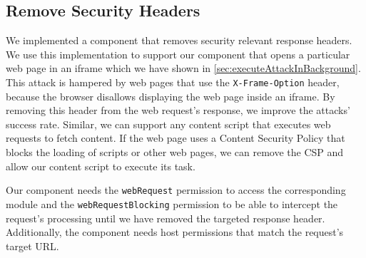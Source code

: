 \subsection{Remove Security Headers}
\label{sec:removeSecurityHeaders}
	
	We implemented a component that removes security relevant response headers. We use this implementation to support our component that opens a particular web page in an iframe which we have shown in \autoref{sec:executeAttackInBackground}. This attack is hampered by web pages that use the \texttt{X-Frame-Option} header, because the browser disallows displaying the web page inside an iframe. By removing this header from the web request's response, we improve the attacks' success rate. Similar, we can support any content script that executes web requests to fetch content. If the web page uses a Content Security Policy that blocks the loading of scripts or other web pages, we can remove the CSP and allow our content script to execute its task.
	
	Our component needs the \texttt{webRequest} permission to access the corresponding module and the \texttt{webRequestBlocking} permission to be able to intercept the request's processing until we have removed the targeted response header. Additionally, the component needs host permissions that match the request's target URL. 